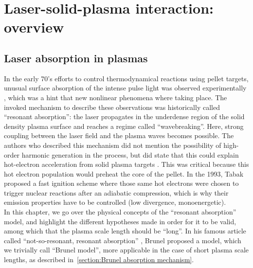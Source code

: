 \chapter{Laser-solid-plasma interaction: overview}\label{chapter:Laser-solid-plasma interaction: overview}
\minitoc

\thispagestyle{empty}

\section{Laser absorption in plasmas}
\label{sec:LaserAbsorptions}

In the early 70's efforts to control thermodynamical reactions using pellet targets\cite{nuckolls1972laser}, unusual surface absorption of the intense pulse light was observed experimentally \cite{self1976lawrence,brueckner1974laser,priedhorsky1981hard}, which was a hint that new nonlinear phenomena where taking place. The invoked mechanism to describe these observations was historically called ``resonant absorption'': the laser propagates in the underdense region of the solid density plasma  surface and reaches a regime called ``wavebreaking''. Here, strong coupling between the laser field and the plasma waves becomes possible. The authors who described this mechanism did not mention the possibility of high-order harmonic generation in the process, but did state that this could explain hot-electron acceleration from solid plasma targets \cite{freidberg1972resonant,albritton1975cold}. This was critical because this hot electron population would preheat the core of the pellet. In the 1993, Tabak~\cite{tabak1994ignition} proposed a fast ignition scheme where those same hot electrons were chosen to trigger nuclear reactions after an adiabatic compression, which is why their emission properties have to be controlled (low divergence, monoenergetic).\\
 In this chapter, we go over the physical concepts of the ``resonant absorption'' model, and highlight the different hypotheses made in order for it to be valid, among which that the plasma scale length should be ``long''. In his famous article called ``not-so-resonant, resonant absorption'' \cite{Brunel1987}, Brunel proposed a model, which we trivially call ``Brunel model'', more applicable in the case of short plasma scale lengths, as described in~\ref{section:Brunel absorption mechanism}.





